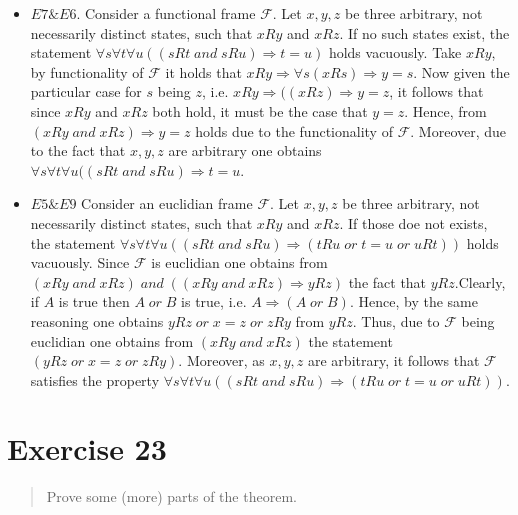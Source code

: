 \documentclass[11pt,a4paper]{article}
\newcommand{\sand}{\; and \;}
\newcommand{\sor}{ \; or \;}
\newcommand{\sto}{\Rightarrow}
\begin{document}
\begin{itemize}
\item $E7 \& E6$. Consider a functional frame $\mathcal{F}$. Let $x,y,z$ be three arbitrary, not necessarily distinct states, such that $xRy$ and $xRz$. If no such states exist, the statement $\forall s \forall t \forall u ((sRt \sand sRu) \sto t=u)$ holds vacuously. Take $xRy$, by functionality of $\mathcal{F}$ it holds that $xRy \sto \forall s (xRs) \sto y=s$. Now given the particular case for $s$ being $z$, i.e. $xRy \sto ((xRz) \sto y=z$, it follows that since $xRy$ and $xRz$ both hold, it must be the case that $y=z$. Hence, from $(xRy \sand xRz) \sto y=z$ holds due to the functionality of $\mathcal{F}$. Moreover, due to the fact that $x,y,z$ are arbitrary one obtains $\forall s \forall t \forall u ((sRt \sand sRu) \sto t=u$.

\item $E5 \& E9$ Consider an euclidian frame $\mathcal{F}$. Let $x,y,z$ be three arbitrary, not necessarily distinct states, such that $xRy$ and $xRz$. If those doe not exists, the statement $\forall s \forall t \forall u ((sRt \sand sRu) \sto (tRu \sor t=u \sor uRt))$ holds vacuously. Since $\mathcal{F}$ is euclidian one obtains from $(xRy \sand xRz) \sand ((xRy \sand xRz) \sto yRz)$ the fact that $yRz$.Clearly, if $A$ is true then $A \sor B$ is true, i.e. $A \sto (A \sor B)$. Hence, by the same reasoning one obtains $yRz \sor x=z \sor zRy$ from $yRz$. Thus, due to $\mathcal{F}$ being euclidian one obtains from $(xRy \sand xRz)$ the statement $(yRz \sor x=z \sor zRy)$. Moreover, as $x,y,z$ are arbitrary, it follows that $\mathcal{F}$ satisfies the property $\forall s \forall t \forall u ((sRt \sand sRu) \sto (tRu \sor t=u \sor uRt))$.
\end{itemize}



\section*{Exercise 23}
\begin{quote}
Prove some (more) parts of the theorem.
\end{quote}
\end{document}
